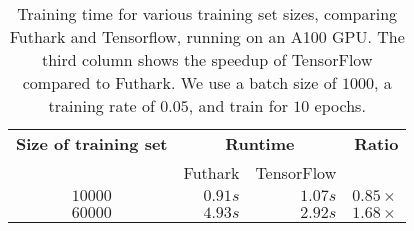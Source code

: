 \begin{table}
\begin{tabular}{crrr}
\textbf{Size of training set} & \multicolumn{2}{c}{\textbf{Runtime}} & \textbf{Ratio} \\
& Futhark & TensorFlow & \\
$10000$ & $0.91s$ & $1.07s$ & $0.85\times{}$ \\
$60000$ & $4.93s$ & $2.92s$ & $1.68\times{}$
\end{tabular}
\caption{Training time for various training set sizes, comparing
  Futhark and Tensorflow, running on an A100 GPU. The third column
  shows the speedup of TensorFlow compared to Futhark. We use a batch
  size of $1000$, a training rate of $0.05$, and train for $10$
  epochs.}
\label{tab:performance}
\end{table}

%





